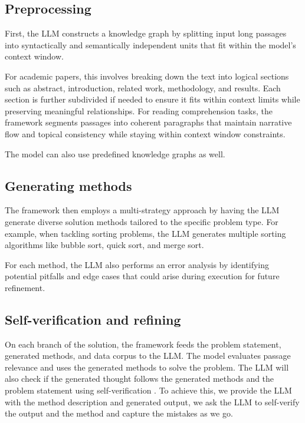\documentclass{article}
\begin{document}
\subsection{Preprocessing}

First, the LLM constructs a knowledge graph by splitting input long passages into syntactically and semantically independent units that fit within the model's context window.

For academic papers, this involves breaking down the text into logical sections such as abstract, introduction, related work, methodology, and results. Each section is further subdivided if needed to ensure it fits within context limits while preserving meaningful relationships. For reading comprehension tasks, the framework segments passages into coherent paragraphs that maintain narrative flow and topical consistency while staying within context window constraints.

The model can also use predefined knowledge graphs as well.

\subsection{Generating methods}

The framework then employs a multi-strategy approach by having the LLM generate diverse solution methods tailored to the specific problem type. For example, when tackling sorting problems, the LLM generates multiple sorting algorithms like bubble sort, quick sort, and merge sort. 

For each method, the LLM also performs an error analysis by identifying potential pitfalls and edge cases that could arise during execution for future refinement.

\subsection{Self-verification and refining}

On each branch of the solution, the framework feeds the problem statement, generated methods, and data corpus to the LLM. The model evaluates passage relevance and uses the generated methods to solve the problem. The LLM will also check if the generated thought follows the generated methods and the problem statement using self-verification \cite{weng2023largelanguagemodelsbetter}. To achieve this, we provide the LLM with the method description and generated output, we ask the LLM to self-verify the output and the method and capture the mistakes as we go.
\end{document}
